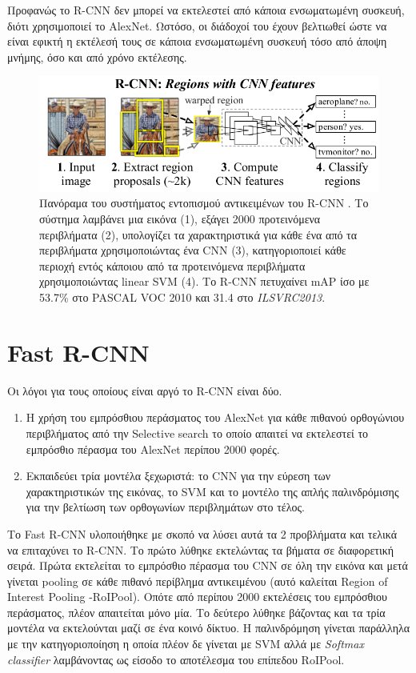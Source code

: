 Προφανώς το R-CNN δεν μπορεί να εκτελεστεί από κάποια ενσωματωμένη συσκευή, διότι χρησιμοποιεί το AlexNet. Ωστόσο, οι διάδοχοί του έχουν βελτιωθεί ώστε να είναι εφικτή η εκτέλεσή τους σε κάποια ενσωματωμένη συσκευή τόσο από άποψη μνήμης, όσο και από χρόνο εκτέλεσης.

\begin{figure}
\centering
\includegraphics[width = \textwidth]{figures/RCNN/RCNN_overview.png}
\caption[Αρχιτεκτονική RCNN]{Πανόραμα του συστήματος εντοπισμού αντικειμένων του R-CNN \cite{10}. Το σύστημα λαμβάνει μια εικόνα (1), εξάγει 2000 προτεινόμενα περιβλήματα (2), υπολογίζει τα χαρακτηριστικά για κάθε ένα από τα περιβλήματα χρησιμοποιώντας ένα CNN (3), κατηγοριοποιεί κάθε περιοχή εντός κάποιου από τα προτεινόμενα περιβλήματα χρησιμοποιώντας linear SVM (4). Το R-CNN πετυχαίνει mAP ίσο με 53.7\% στο PASCAL VOC 2010 και 31.4 στο \textit{ILSVRC2013}.}
\label{fig:RCNN_overview}
\end{figure}

\section{Fast R-CNN \cite{11}}

Οι λόγοι για τους οποίους είναι αργό το R-CNN είναι δύο.
\begin{enumerate}
    \item Η χρήση του εμπρόσθιου περάσματος του AlexNet για κάθε πιθανού ορθογώνιου περιβλήματος από την Selective search το οποίο απαιτεί να εκτελεστεί το εμπρόσθιο πέρασμα του AlexNet περίπου 2000 φορές.
    \item Εκπαιδεύει τρία μοντέλα ξεχωριστά: το CNN για την εύρεση των χαρακτηριστικών της εικόνας, το SVM και το μοντέλο της απλής παλινδρόμισης για την βελτίωση των ορθογωνίων περιβλημάτων στο τέλος.
\end{enumerate}

Το Fast R-CNN υλοποιήθηκε με σκοπό να λύσει αυτά τα 2 προβλήματα και τελικά να επιταχύνει το R-CNN. Το πρώτο λύθηκε εκτελώντας τα βήματα σε διαφορετική σειρά. Πρώτα εκτελείται το εμπρόσθιο πέρασμα του CNN σε όλη την εικόνα και μετά γίνεται pooling σε κάθε πιθανό περίβλημα αντικειμένου (αυτό καλείται Region of Interest Pooling -RoIPool). Οπότε από περίπου 2000 εκτελέσεις του εμπρόσθιου περάσματος, πλέον απαιτείται μόνο μία. Το δεύτερο λύθηκε βάζοντας και τα τρία μοντέλα να εκτελούνται μαζί σε ένα κοινό δίκτυο. Η παλινδρόμηση γίνεται παράλληλα με την κατηγοριοποίηση η οποία πλέον δε γίνεται με SVM αλλά με \textit{Softmax classifier} λαμβάνοντας ως είσοδο το αποτέλεσμα του επίπεδου RoIPool. 

